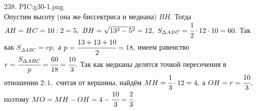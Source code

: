238. {{PIC:g30-1.png}}\\
Опустим высоту (она же биссектриса и медиана) $BH.$ Тогда $AH=HC=10:2=5,\ BH=\sqrt{13^2-5^2}=12,\ S_{\Delta ABC}=\cfrac{1}{2}\cdot12\cdot10=60.$ Так как $S_{\Delta ABC}=rp,$ а $p=\cfrac{13+13+10}{2}=18,$ имеем равенство $r=\cfrac{S_{\Delta ABC}}{p}=\cfrac{60}{18}=\cfrac{10}{3}.$ Так как медианы делятся точкой пересечения в отношении $2:1,$ считая от вершины, найдём $MH=\cfrac{1}{3}\cdot12=4,$ а $OH=r=\cfrac{10}{3},$ поэтому $MO=MH-OH=4-\cfrac{10}{3}=\cfrac{2}{3}.$\\
